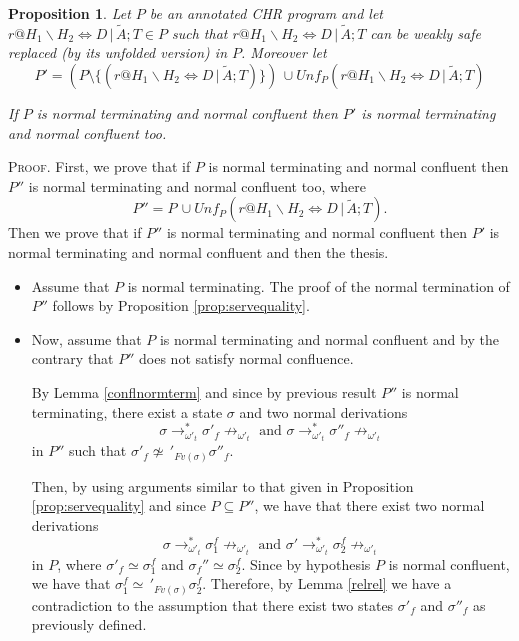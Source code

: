\documentclass[final]{acmtrans2e}
\newtheorem{proposition}[theorem]{Proposition}
\newcommand{\rrarrow}{\longrightarrow}
\begin{document}
\begin{proposition}\label{prop:wterm}
Let $P$ be an annotated CHR program and let $r@H_1\backslash H_2 \Leftrightarrow  D\,|\,\tilde A; T \in P$ such that $r@H_1\backslash H_2 \Leftrightarrow  D\,|\,\tilde A; T $
can be weakly safe replaced (by its unfolded version) in $P$. Moreover let
\[P'  =  (P\setminus   \{(r@H_1\backslash H_2 \Leftrightarrow D\,|\,\tilde A; T)\} ) \, \cup
   Unf_{P}(r@H_1\backslash H_2 \Leftrightarrow D\,|\,\tilde A; T)\]

    If $P$ is normal terminating and normal confluent then  $P'$ is normal terminating and normal confluent too.
\end{proposition}
\textsc{Proof.}
First, we prove that if $P$ is normal terminating and normal confluent then  $P''$ is normal terminating and normal confluent too, where
\[P''= P \, \cup
   Unf_{P}(r@H_1\backslash H_2 \Leftrightarrow D\,|\,\tilde A; T). \]
   Then we prove that if $P''$ is normal terminating and
   normal confluent then $P'$ is normal terminating and normal confluent and then the thesis.
\begin{itemize}
   \item Assume that $P$ is normal terminating.
  The proof of the normal termination of $P''$ follows by Proposition \ref{prop:servequality}.

   \item Now, assume that $P$ is normal terminating and normal confluent and by the contrary that $P''$ does not satisfy normal confluence.


       By Lemma \ref{conflnormterm} and since by previous result $P''$ is normal terminating, there exist a state
$\sigma$ and two normal derivations
\[\sigma\rrarrow_{\omega'_t}^{*}\sigma'_f \not \rrarrow_{\omega'_t} \mbox{ and } \sigma\rrarrow_{\omega'_t}^{*}\sigma''_f\not \rrarrow_{\omega'_t}
\] in $P''$
such that
$\sigma'_f \not \simeq\,'_{Fv(\sigma)}\sigma''_f$.


Then, by using arguments similar to that given in Proposition \ref{prop:servequality} and since $P\subseteq P''$, we have that there exist two normal derivations
\[\sigma\rrarrow_{\omega'_t}^{*}\sigma_1^f \not \rrarrow_{\omega'_t}\mbox{ and } \sigma'\rrarrow_{\omega'_t}^{*}\sigma_2^f
\not \rrarrow_{\omega'_t}\]
in $P$, where
 $\sigma'_f \simeq \sigma_1^f$ and $\sigma_f'' \simeq \sigma_2^f$. Since by hypothesis $P$ is normal confluent, we have that $\sigma_1^f \simeq\,'_{Fv(\sigma)}\sigma_2^f$.
  Therefore, by Lemma \ref{relrel} we have a contradiction to the assumption that there exist two states $\sigma'_f$ and $\sigma''_f$ as previously defined.
 \end{itemize}
\end{document}
